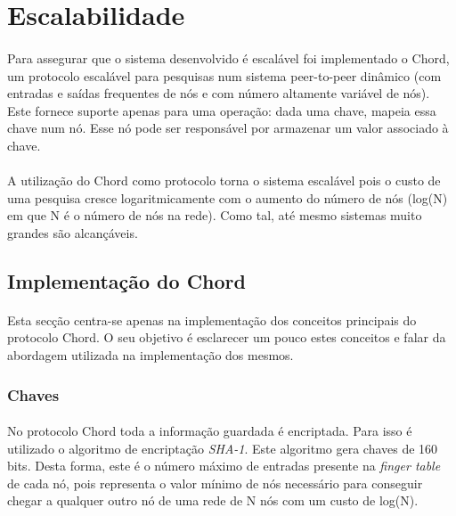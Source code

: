 \documentclass[11pt,oneside]{book}
\begin{document}
\pagebreak

\section{Escalabilidade}
\paragraph{}
    Para assegurar que o sistema desenvolvido é escalável foi implementado o Chord,
    um protocolo escalável para pesquisas num sistema peer-to-peer dinâmico (com 
    entradas e saídas frequentes de nós e com número altamente variável de nós).
    Este fornece suporte apenas para uma operação: dada uma chave, mapeia essa 
    chave num nó. Esse nó pode ser responsável por armazenar um valor associado
    à chave. 

\paragraph{}
    A utilização do Chord como protocolo torna o sistema escalável pois o custo de
    uma pesquisa cresce logaritmicamente com o aumento do número de nós (log(N) em
    que N é o número de nós na rede). Como tal, até mesmo sistemas muito grandes são 
    alcançáveis.

\subsection{Implementação do Chord}
\paragraph{}
    Esta secção centra-se apenas na implementação dos conceitos principais do protocolo Chord. 
    O seu objetivo é esclarecer um pouco estes conceitos e falar da abordagem utilizada na
    implementação dos mesmos.

    \subsubsection{Chaves}
    \paragraph{}
    No protocolo Chord toda a informação guardada é encriptada. Para isso é utilizado o algoritmo
    de encriptação \textit{SHA-1}. Este algoritmo gera chaves de 160 bits. Desta forma, 
    este é o número máximo de entradas presente na \textit{finger table} de cada nó, pois 
    representa o valor mínimo de nós necessário para conseguir chegar a qualquer outro nó de
    uma rede de N nós com um custo de log(N). 
\end{document}
